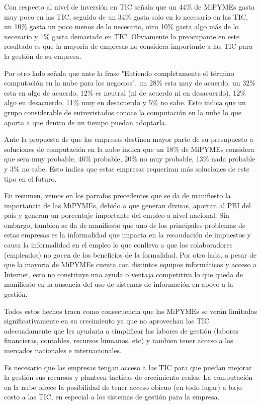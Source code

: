 Con respecto al nivel de inversi\'on en TIC \cite{ipsos} se\~nala que un 44\% de MiPYMEs
gasta muy poco en las TIC, seguido de un 34\% gasta solo en lo necesario en las TIC,
un 10\% gasta un poco menos de lo necesario, otro 10\% gasta algo m\'as de lo necesario y
1\% gasta demasiado en TIC. Obviamente lo preocupante en este resultado es que la
mayoria de empresas no considera importante a las TIC para la gesti\'on de su empresa.

Por otro lado \cite{ipsos} se\~nala que ante la frase "Entiendo completamente el
t\'ermino computaci\'on en la nube para los negocios", un 28\% esta muy de acuerdo, un 32\%
esta en algo de acuerdo, 12\% es neutral (ni de acuerdo ni en desacuerdo), 12\%
algo en desacuerdo, 11\% muy en desacuerdo y 5\% no sabe. Esto indica que un grupo
considerable de entrevistados conoce la computaci\'on en la nube lo que aporta a que
dentro de un tiempo puedan adoptarla.

Ante la propuesta de que las empresas destinen mayor parte de su presupuesto a
soluciones de computaci\'on en la nube \cite{ipsos} indica que un 18\% de MiPYMEs
considera que sera muy probable, 46\% probable, 20\% no muy probable, 13\% nada
probable y 3\% no sabe. Esto indica que estas empresas requeriran m\'as soluciones
de este tipo en el futuro.

En resumen, vemos en los parrafos precedentes que se da de manifiesto la importancia
de las MiPYMEs, debido a que generan divisas, aportan al PBI del pa\'is y generan
un porcentaje importante del empleo a nivel nacional. Sin embargo, tambien se da
de manifiesto que uno de los principales problemas de estas empresas es la informalidad
que impacta en la recaudaci\'on de impuestos y causa la informalidad en el empleo
lo que conlleva a que los colaboradores (empleados) no gocen de los beneficios de la formalidad.
Por otro lado, a pesar de que la mayoria de MiPYMEs cuenta con distintos equipos
inform\'aticos y acceso a Internet, esto no constituye una ayuda o ventaja competitiva
lo que queda de manifiesto en la ausencia del uso de sistemas de informaci\'on en
apoyo a la gesti\'on.

Todos estos hechos traen como consecuencia que las MiPYMEs se ver\'an limitadas
significativamente en su crecimiento ya que no aprovechan las TIC adecuadamente
que les ayudaria a simplificar las labores de gesti\'on (labores financieras, contables,
recursos humanos, etc) y tambien tener acceso a los mercados nacionales e internacionales.

Es necesario que las empresas tengan acceso a las TIC para que puedan mejorar la
gesti\'on sus recursos y planteen tacticas de crecimiento reales. La computaci\'on
en la nube ofrece la posibilidad de tener acceso obicuo (en todo lugar) a bajo
costo a las TIC, en especial a los sistemas de gesti\'on para la empresa.

